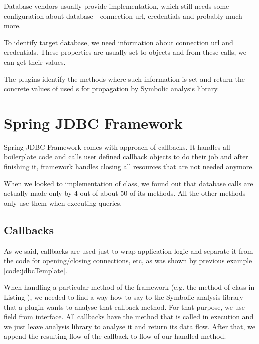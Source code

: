 Database vendors usually provide  implementation, which still
needs some configuration about database - connection url, credentials and probably much more.

To identify target database, we need information about connection url and credentials. These properties
are usually set to  objects and from these calls, we can get
their values.

The plugins identify the methods where such information is set and return
the concrete values of used s for propagation by Symbolic analysis library.



\section{Spring JDBC Framework}

Spring JDBC Framework comes with approach of callbacks. It handles
all boilerplate code and calls user defined callback objects to do their job
and after finishing it, framework handles closing all resources that are not needed anymore.

When we looked to implementation of  class, we found out
that database calls are actually made only by 4 out of about 50 of its methods.
All the other methods only use them when executing queries.



\subsection{Callbacks}

As we said, callbacks are used just to wrap application logic and
separate it from the code for opening/closing connections, etc,
as was shown by previous example \ref{code:jdbcTemplate}.

When handling a particular method of the framework (e.g. the 
method of  class in Listing ),
we needed to find a way how to say to the Symbolic analysis library that a plugin wants to
analyse that callback method. For that purpose, we use
field  from interface. 
All callbacks have the method that is called in execution
and we just leave analysis library to analyse it and return
its data flow. After that, we append the resulting flow of the callback
to flow of our handled method.

